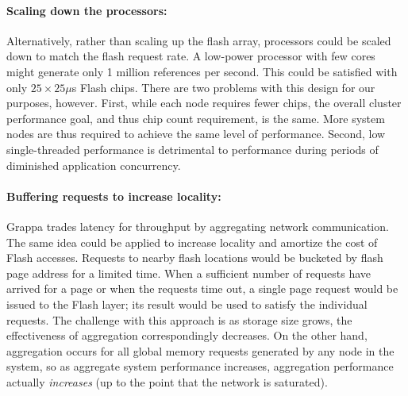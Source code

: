 \paragraph{Scaling down the processors:} Alternatively, rather than scaling up the flash array, processors could be scaled down to match the flash request rate. A low-power processor with few cores might generate only 1 million references per second. This could be satisfied with only $25\times 25\mu$s Flash chips. There are two problems with this design for our purposes, however. First, while each node requires fewer chips, the overall cluster performance goal, and thus chip count requirement, is the same. More system nodes are thus required to achieve the same level of performance.  Second, low single-threaded performance is detrimental to performance during periods of diminished application concurrency.

\paragraph{Buffering requests to increase locality:} Grappa trades latency for throughput by aggregating network communication. The same idea could be applied to increase locality and amortize the cost of Flash accesses. Requests to nearby flash locations would be bucketed by flash page address for a limited time. When a sufficient number of requests have arrived for a page or when the requests time out, a single page request would be issued to the Flash layer; its result would be used to satisfy the individual requests.  The challenge with this approach is as storage size grows, the effectiveness of aggregation correspondingly decreases.  On the other hand, aggregation occurs for all global memory requests generated by any node in the system, so as aggregate system performance increases, aggregation performance actually \emph{increases} (up to the point that the network is saturated).



